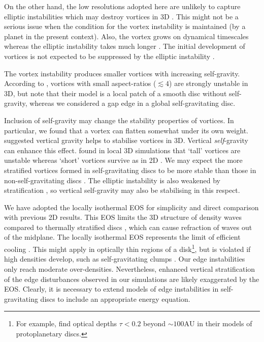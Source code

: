 On the other hand, the low resolutions adopted here are unlikely to
capture elliptic instabilities which may destroy 
vortices in 3D \citep{lesur09b,lesur10}. 
This might not be a serious
issue when the condition for the vortex instability is maintained 
(by a planet in the present context). Also, the vortex 
grows on dynamical timescales whereas the elliptic instability takes
much longer \citep{lesur09b}. The initial development of vortices is not expected to be 
suppressed by the elliptic instability \citep[as found
  by][]{meheut12a}.   

The vortex instability produces smaller vortices with increasing
self-gravity. According to \cite{lesur09b}, vortices with small
aspect-ratios ($\lesssim 4$) are strongly unstable in 3D, but note that their  
model is a local patch of a smooth disc without self-gravity, 
whereas we considered a gap edge in a global self-gravitating disc. 

Inclusion of self-gravity may change the stability properties of
vortices. In particular, we found that a vortex can flatten somewhat under its own
weight. \cite{lithwick09} suggested vertical gravity helps to 
stabilise vortices in 3D. Vertical \emph{self}-gravity 
can enhance this effect.  \citeauthor{lithwick09} 
found in local 3D simulations that `tall' vortices are unstable 
whereas `short' vortices survive as in 2D \citep{godon99}. 
We may expect the more stratified vortices formed in self-gravitating 
discs to be more stable than those in non-self-gravitating discs \citep{barranco05}. 
The elliptic instability is also weakened by stratification \citep{lesur09b}, 
so vertical self-gravity may also be stabilising in this respect. 

% 

 
We have adopted the locally isothermal EOS for simplicity and direct
comparison with previous 2D results. This EOS limits the 3D 
structure of density waves compared to thermally 
stratified discs \citep[e.g][]{lin90,lubow98,ogilvie99}, which can 
cause refraction of waves out of the midplane.  
The locally isothermal EOS represents the limit of efficient cooling
\citep{boss98}. This might apply in optically thin
regions of a disk\footnote{For example, \cite{cossins10} find optical
depths $\tau < 0.2$ beyond $\sim100\mathrm{AU}$ in their models of protoplanetary
discs.}, but is violated if high densities develop, such as 
self-gravitating clumps \citep{pickett00}. Our edge instabilities only 
reach moderate over-densities. Nevertheless, enhanced
vertical stratification of the edge disturbances observed in our
simulations are likely exaggerated by the EOS. Clearly, it is necessary to
extend models of edge instabilities in self-gravitating discs to
include an appropriate energy equation. 
                                                            

